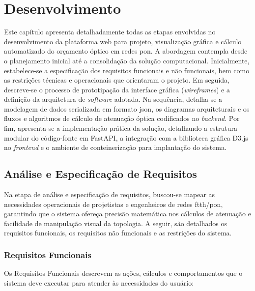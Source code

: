\chapter{Desenvolvimento}

Este capítulo apresenta detalhadamente todas as etapas envolvidas no desenvolvimento da plataforma web para projeto, visualização gráfica e cálculo automatizado do orçamento óptico em redes \gls{pon}. A abordagem contempla desde o planejamento inicial até a consolidação da solução computacional. Inicialmente, estabelece-se a especificação dos requisitos funcionais e não funcionais, bem como as restrições técnicas e operacionais que orientaram o projeto. Em seguida, descreve-se o processo de prototipação da interface gráfica (\textit{wireframes}) e a definição da arquitetura de \textit{software} adotada. Na sequência, detalha-se a modelagem de dados serializada em formato \gls{json}, os diagramas arquiteturais e os fluxos e algoritmos de cálculo de atenuação óptica codificados no \textit{backend}. Por fim, apresenta-se a implementação prática da solução, detalhando a estrutura modular do código-fonte em FastAPI, a integração com a biblioteca gráfica D3.js no \textit{frontend} e o ambiente de conteinerização para implantação do sistema.

\section{Análise e Especificação de Requisitos}

Na etapa de análise e especificação de requisitos, buscou-se mapear as necessidades operacionais de projetistas e engenheiros de redes \gls{ftth}/\gls{pon}, garantindo que o sistema ofereça precisão matemática nos cálculos de atenuação e facilidade de manipulação visual da topologia. A seguir, são detalhados os requisitos funcionais, os requisitos não funcionais e as restrições do sistema.

\subsection{Requisitos Funcionais}

Os Requisitos Funcionais descrevem as ações, cálculos e comportamentos que o sistema deve executar para atender às necessidades do usuário:


